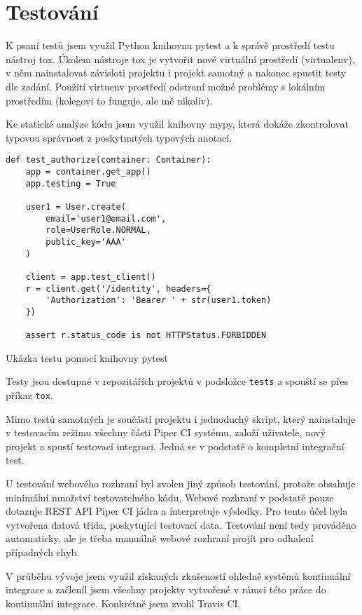 \chapter{Testování}

K psaní testů jsem využil Python knihovnu pytest a k správě prostředí testu nástroj tox.
Úkolem nástroje tox je vytvořit nové virtuální prostředí (virtualenv), v něm nainstalovat závisloti projektu i projekt samotný a nakonec spustit testy dle zadání.
Použití virtuenv prostředí odstraní možné problémy s lokálním prostředím (kolegovi to funguje, ale mě nikoliv).

Ke statické analýze kódu jsem využil knihovny mypy, která dokáže zkontrolovat typovou správnost z poskytnutých typových anotací.

\begin{listing}[ht]
\begin{verbatim}
def test_authorize(container: Container):
    app = container.get_app()
    app.testing = True

    user1 = User.create(
        email='user1@email.com',
        role=UserRole.NORMAL,
        public_key='AAA'
    )

    client = app.test_client()
    r = client.get('/identity', headers={
        'Authorization': 'Bearer ' + str(user1.token)
    })

    assert r.status_code is not HTTPStatus.FORBIDDEN
\end{verbatim}
\caption{Ukázka testu pomocí knihovny pytest}
\end{listing}

Testy jsou dostupné v repozitářích projektů v podsložce \verb|tests| a spouští se přes příkaz \verb|tox|.

Mimo testů samotných je součástí projektu i jednoduchý skript, který nainstaluje v testovacím režimu všechny části Piper CI systému, založí uživatele, nový projekt a spustí testovací integraci.
Jedná se v podstatě o kompletní integrační test.

U testování webového rozhraní byl zvolen jiný způsob testování, protože obsahuje minimální množství testovatelného kódu.
Webové rozhraní v podstatě pouze dotazuje REST API Piper CI jádra a interpretuje výsledky.
Pro tento účel byla vytvořena  datová třída, poskytující testovací data.
Testování není tedy prováděno automaticky, ale je třeba manuálně webové rozhraní projít pro odhalení případných chyb.

V průběhu vývoje jsem využil získaných zkušeností ohledně systémů kontinuální integrace a začleníl jsem všechny projekty vytvořené v rámci této práce do kontinuální integrace.
Konkrétně jsem zvolil Travis CI.

